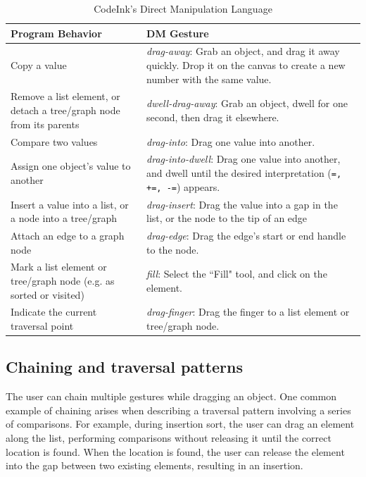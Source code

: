 \begin{table}[!t]
\vspace{-2em}
\renewcommand{\arraystretch}{1.75}
\caption{CodeInk's Direct Manipulation Language}
\label{tbl:language_table}
\centering
\begin{tabular}{|p{3.8cm} |p{3.8cm} |}
\hline
\textbf{Program Behavior} & \textbf{DM Gesture} \\
\hline
Copy a value & {\em drag-away}: Grab an object, and drag it away quickly.
Drop it on the canvas to create a new number with the same value.
\\
\hline
Remove a list element, or detach a tree/graph node from its parents &
{\em dwell-drag-away}: Grab an object, dwell for one second, then
drag it elsewhere.
\\
\hline
Compare two values & {\em drag-into}: Drag one value into another.
\\
\hline
Assign one object's value to another &
{\em drag-into-dwell}: Drag one value into another, and
dwell until the desired interpretation (\texttt{=, +=, -=}) appears. \\
\hline
Insert a value into a list, or a node into a tree/graph
& {\em drag-insert}: Drag the value into a gap in the list, or the node to the
tip of an edge
\\

\hline
Attach an edge to a graph node
& {\em drag-edge}: Drag the edge's start or end handle to the node.
\\

\hline
Mark a list element or tree/graph node (e.g. as sorted or visited) &
{\em fill}: Select the ``Fill" tool, and click on the element. \\
\hline
Indicate the current traversal point & {\em drag-finger}: Drag the finger to a
list element or tree/graph node.
\\
\hline
\end{tabular}
\end{table}

\subsection{Chaining and traversal patterns}
The user can chain multiple gestures while dragging an object. One common
example of chaining arises when describing a traversal pattern involving a
series of comparisons. For example, during insertion sort, the user can drag an
element along the list, performing comparisons without releasing it until the
correct location is found. When the location is found, the user can release the
element into the gap between two existing elements, resulting in an insertion.

